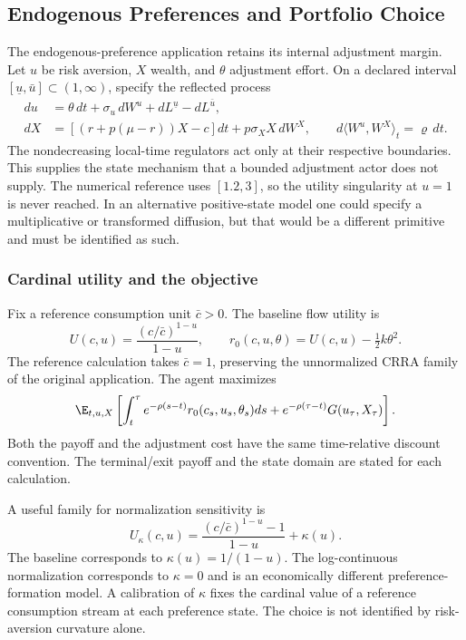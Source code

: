 \subsection{Endogenous Preferences and Portfolio Choice}\label{sec:ndu}
The endogenous-preference application retains its internal adjustment margin. Let $u$ be risk aversion, $X$ wealth, and $\theta$ adjustment effort. On a declared interval $[\underline u,\bar u]\subset(1,\infty)$, specify the reflected process
\begin{align}
 du&=\theta\,dt+\sigma_u\,dW^u+dL^{\underline u}-dL^{\bar u},\label{eq:ndustate}\\
 dX&=[(r+p(\mu-r))X-c]dt+p\sigma_X X\,dW^X,
 \qquad d\langle W^u,W^X\rangle_t=\varrho\,dt.
\end{align}
The nondecreasing local-time regulators act only at their respective boundaries. This supplies the state mechanism that a bounded adjustment actor does not supply. The numerical reference uses $[1.2,3]$, so the utility singularity at $u=1$ is never reached. In an alternative positive-state model one could specify a multiplicative or transformed diffusion, but that would be a different primitive and must be identified as such.

\subsubsection{Cardinal utility and the objective}
Fix a reference consumption unit $\bar c>0$. The baseline flow utility is
\begin{equation}\label{eq:nduutility}
 U(c,u)=\frac{(c/\bar c)^{1-u}}{1-u},\qquad
 r_0(c,u,\theta)=U(c,u)-\tfrac12 k\theta^2.
\end{equation}
The reference calculation takes $\bar c=1$, preserving the unnormalized CRRA family of the original application. The agent maximizes
\begin{equation}\label{eq:nduobjective}
 \E_{t,u,X}\left[\int_t^\tau e^{-\rho(s-t)}r_0(c_s,u_s,\theta_s)ds
        +e^{-\rho(\tau-t)}G(u_\tau,X_\tau)\right].
\end{equation}
Both the payoff and the adjustment cost have the same time-relative discount convention. The terminal/exit payoff and the state domain are stated for each calculation.

A useful family for normalization sensitivity is
\[
 U_\kappa(c,u)=\frac{(c/\bar c)^{1-u}-1}{1-u}+\kappa(u).
\]
The baseline corresponds to $\kappa(u)=1/(1-u)$. The log-continuous normalization corresponds to $\kappa=0$ and is an economically different preference-formation model. A calibration of $\kappa$ fixes the cardinal value of a reference consumption stream at each preference state. The choice is not identified by risk-aversion curvature alone.

